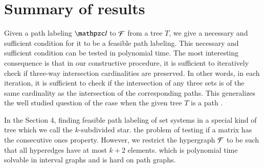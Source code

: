 \documentclass[MS,synopsis]{iitmdiss}
\begin{document}
\section{Summary of results}
\label{sec:results}

Given a path labeling $\cl$ to ${\cal F}$ from a tree $T$, we give a
necessary and sufficient condition for it to be a feasible path
labeling.  This necessary and sufficient condition can be tested in
polynomial time.  The most interesting consequence is that in our
constructive procedure, it is sufficient to iteratively check if
three-way intersection cardinalities are preserved.  In other words,
in each iteration, it is sufficient to check if the intersection of
any three sets is of the same cardinality as the intersection of the
corresponding paths.  This generalizes the well studied question of
the case when the given tree $T$ is a path \cite{wlh02,nsnrs09}.

In the Section 4, 
finding feasible path labeling of set systems in a special kind of
tree which we call the $k$-subdivided star.   the problem of testing if a
matrix has the consecutive ones property.  However, we restrict the
hypergraph ${\cal F}$ to be such that all hyperedges have at most $k+2$
elements.   which is
polynomial time solvable in interval graphs and is hard on path
graphs.



\end{document}
